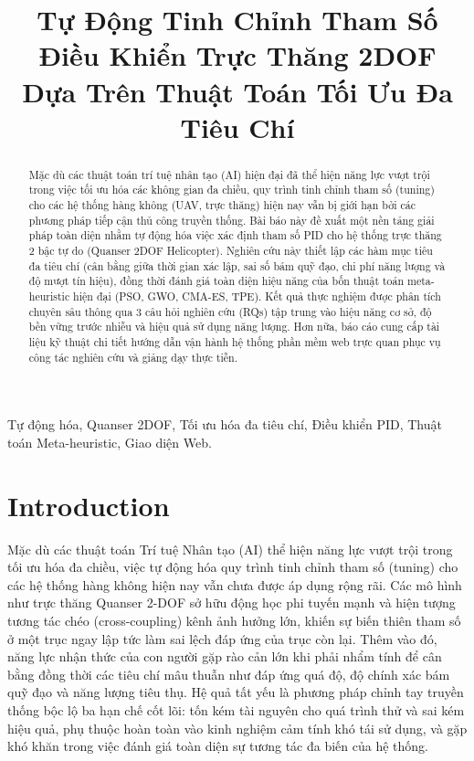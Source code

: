 \documentclass[conference, a4paper]{IEEEtran}
\title{Tự Động Tinh Chỉnh Tham Số Điều Khiển Trực Thăng 2DOF Dựa Trên Thuật Toán Tối Ưu Đa Tiêu Chí}
\author{\IEEEauthorblockN{Trần Lê Minh Nhật}
\IEEEauthorblockA{\textit{Sinh viên thực hiện} \\
\textit{UIT - University of Information and Technology} \\
Việt Nam}
\and
\IEEEauthorblockN{Phạm Lê Thế Anh}
\IEEEauthorblockA{\textit{Mentor hướng dẫn} \\
\textit{VATC - Viettel Aviation Technology Center} \\
anhplt@viettel.com.vn}
}
\begin{document}
\maketitle
\thispagestyle{plain}
\pagestyle{plain}
\raggedbottom

\begin{abstract}
Mặc dù các thuật toán trí tuệ nhân tạo (AI) hiện đại đã thể hiện năng lực vượt trội trong việc tối ưu hóa các không gian đa chiều, quy trình tinh chỉnh tham số (tuning) cho các hệ thống hàng không (UAV, trực thăng) hiện nay vẫn bị giới hạn bởi các phương pháp tiếp cận thủ công truyền thống. Bài báo này đề xuất một nền tảng giải pháp toàn diện nhằm tự động hóa việc xác định tham số PID cho hệ thống trực thăng 2 bậc tự do (Quanser 2DOF Helicopter). Nghiên cứu này thiết lập các hàm mục tiêu đa tiêu chí (cân bằng giữa thời gian xác lập, sai số bám quỹ đạo, chi phí năng lượng và độ mượt tín hiệu), đồng thời đánh giá toàn diện hiệu năng của bốn thuật toán meta-heuristic hiện đại (PSO, GWO, CMA-ES, TPE). Kết quả thực nghiệm được phân tích chuyên sâu thông qua 3 câu hỏi nghiên cứu (RQs) tập trung vào hiệu năng cơ sở, độ bền vững trước nhiễu và hiệu quả sử dụng năng lượng. Hơn nữa, báo cáo cung cấp tài liệu kỹ thuật chi tiết hướng dẫn vận hành hệ thống phần mềm web trực quan phục vụ công tác nghiên cứu và giảng dạy thực tiễn.
\end{abstract}

\begin{IEEEkeywords}
Tự động hóa, Quanser 2DOF, Tối ưu hóa đa tiêu chí, Điều khiển PID, Thuật toán Meta-heuristic, Giao diện Web.
\end{IEEEkeywords}

\section{Introduction}
Mặc dù các thuật toán Trí tuệ Nhân tạo (AI) thể hiện năng lực vượt trội trong tối ưu hóa đa chiều, việc tự động hóa quy trình tinh chỉnh tham số (tuning) cho các hệ thống hàng không hiện nay vẫn chưa được áp dụng rộng rãi. Các mô hình như trực thăng Quanser 2-DOF sở hữu động học phi tuyến mạnh và hiện tượng tương tác chéo (cross-coupling) kênh ảnh hưởng lớn, khiến sự biến thiên tham số ở một trục ngay lập tức làm sai lệch đáp ứng của trục còn lại. Thêm vào đó, năng lực nhận thức của con người gặp rào cản lớn khi phải nhẩm tính để cân bằng đồng thời các tiêu chí mâu thuẫn như đáp ứng quá độ, độ chính xác bám quỹ đạo và năng lượng tiêu thụ. Hệ quả tất yếu là phương pháp chỉnh tay truyền thống bộc lộ ba hạn chế cốt lõi: tốn kém tài nguyên cho quá trình thử và sai kém hiệu quả, phụ thuộc hoàn toàn vào kinh nghiệm cảm tính khó tái sử dụng, và gặp khó khăn trong việc đánh giá toàn diện sự tương tác đa biến của hệ thống.
\end{document}
